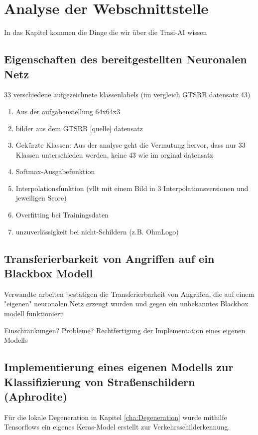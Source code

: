 \chapter{Analyse der Webschnittstelle}
\label{cha:TrasiAnalyse}
In das Kapitel kommen die Dinge die wir über die Trasi-AI wissen
\section{Eigenschaften des bereitgestellten Neuronalen Netz}
\label{sec:TrainingsDaten}




33 verschiedene aufgezeichnete klassenlabels (im vergleich GTSRB datensatz 43)

\begin{enumerate}
	\item 
	Aus der aufgabenstellung 64x64x3
	\item 
	bilder aus dem GTSRB [quelle] datensatz
	\item Gekürzte Klassen: Aus der analyse geht die Vermutung hervor, dass nur 33 Klassen unterschieden werden, keine 43 wie im orginal datensatz
	\item Softmax-Ausgabefunktion 
	\item Interpolationsfunktion (vllt mit einem Bild in 3 Interpolationsversionen und jeweiligen Score) 
	\item Overfitting bei Trainingsdaten
	\item unzuverlässigkeit bei nicht-Schildern (z.B. OhmLogo)
\end{enumerate}

\section{Transferierbarkeit von Angriffen auf ein Blackbox Modell}
\label{sec:TrasiModell}
Verwandte arbeiten bestätigen  die Transferierbarkeit von Angriffen, die auf einem "eigenen" neuronalen Netz erzeugt wurden und gegen ein unbekanntes Blackbox modell funktioniern

Einschränkungen? Probleme? Rechtfertigung der Implementation eines eigenen Modells


\section{Implementierung eines eigenen Modells zur Klassifizierung von Straßenschildern (Aphrodite)}
Für die lokale Degeneration in Kapitel \ref{cha:Degeneration} wurde mithilfe Tensorflows ein eigenes Keras-Model erstellt zur Verkehrsschilderkennung. 

